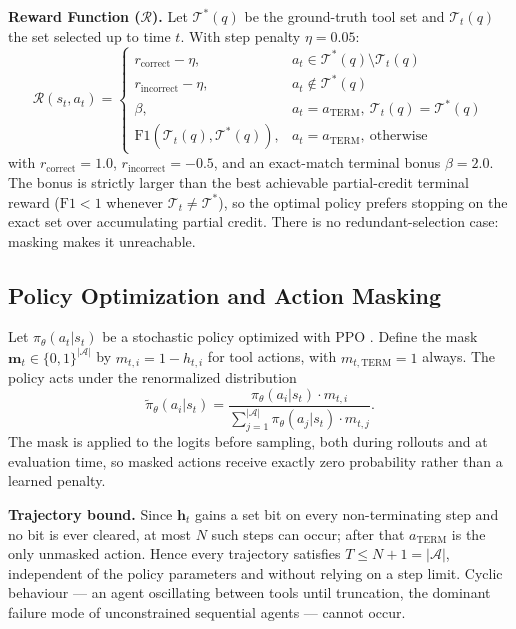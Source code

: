 \documentclass[11pt]{article}
\begin{document}
\textbf{Reward Function ($\mathcal{R}$).}
Let $\mathcal{T}^*(q)$ be the ground-truth tool set and $\mathcal{T}_t(q)$ the set selected up to time $t$. With step penalty $\eta = 0.05$:
\begin{equation}
\mathcal{R}(s_t, a_t) =
\begin{cases}
r_{\text{correct}} - \eta, & a_t \in \mathcal{T}^*(q) \setminus \mathcal{T}_t(q) \\
r_{\text{incorrect}} - \eta, & a_t \notin \mathcal{T}^*(q) \\
\beta, & a_t = a_{\text{TERM}},\ \mathcal{T}_t(q) = \mathcal{T}^*(q) \\
\text{F1}(\mathcal{T}_t(q), \mathcal{T}^*(q)), & a_t = a_{\text{TERM}},\ \text{otherwise}
\end{cases}
\end{equation}
with $r_{\text{correct}} = 1.0$, $r_{\text{incorrect}} = -0.5$, and an exact-match terminal bonus $\beta = 2.0$. The bonus is strictly larger than the best achievable partial-credit terminal reward ($\text{F1} < 1$ whenever $\mathcal{T}_t \neq \mathcal{T}^*$), so the optimal policy prefers stopping on the exact set over accumulating partial credit. There is no redundant-selection case: masking makes it unreachable.

\subsection{Policy Optimization and Action Masking}
\label{sec:masking}
Let $\pi_\theta(a_t | s_t)$ be a stochastic policy optimized with PPO \cite{schulman2017ppo}. Define the mask $\mathbf{m}_t \in \{0,1\}^{|\mathcal{A}|}$ by $m_{t,i} = 1 - h_{t,i}$ for tool actions, with $m_{t,\text{TERM}} = 1$ always. The policy acts under the renormalized distribution
\begin{equation}
\tilde{\pi}_\theta(a_i | s_t) = \frac{\pi_\theta(a_i | s_t) \cdot m_{t, i}}{\sum_{j=1}^{|\mathcal{A}|} \pi_\theta(a_j | s_t) \cdot m_{t, j}}.
\end{equation}
The mask is applied to the logits before sampling, both during rollouts and at evaluation time, so masked actions receive exactly zero probability rather than a learned penalty.

\textbf{Trajectory bound.} Since $\mathbf{h}_t$ gains a set bit on every non-terminating step and no bit is ever cleared, at most $N$ such steps can occur; after that $a_{\text{TERM}}$ is the only unmasked action. Hence every trajectory satisfies $T \le N + 1 = |\mathcal{A}|$, independent of the policy parameters and without relying on a step limit. Cyclic behaviour --- an agent oscillating between tools until truncation, the dominant failure mode of unconstrained sequential agents --- cannot occur.
\end{document}

